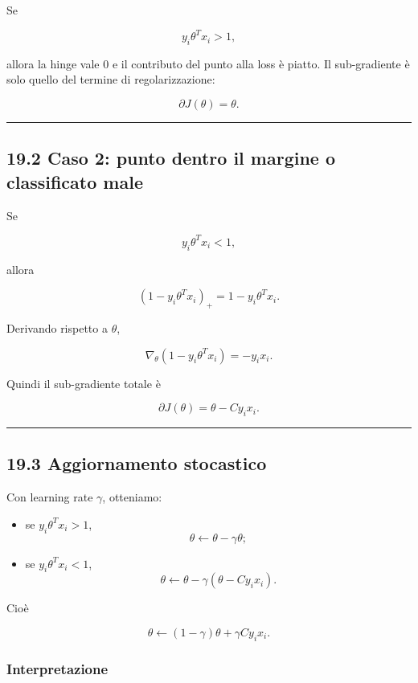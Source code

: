 \documentclass[
]{article}
\begin{document}
Se

\[
y_i\theta^Tx_i > 1,
\]

allora la hinge vale \(0\) e il contributo del punto alla loss è piatto.
Il sub-gradiente è solo quello del termine di regolarizzazione:

\[
\partial J(\theta)=\theta.
\]

\begin{center}\rule{0.5\linewidth}{0.5pt}\end{center}

\subsection{19.2 Caso 2: punto dentro il margine o classificato
male}\label{caso-2-punto-dentro-il-margine-o-classificato-male}

Se

\[
y_i\theta^Tx_i < 1,
\]

allora

\[
(1-y_i\theta^Tx_i)_+ = 1-y_i\theta^Tx_i.
\]

Derivando rispetto a \(\theta\),

\[
\nabla_\theta(1-y_i\theta^Tx_i) = -y_i x_i.
\]

Quindi il sub-gradiente totale è

\[
\partial J(\theta)=\theta - C y_i x_i.
\]

\begin{center}\rule{0.5\linewidth}{0.5pt}\end{center}

\subsection{19.3 Aggiornamento
stocastico}\label{aggiornamento-stocastico}

Con learning rate \(\gamma\), otteniamo:

\begin{itemize}
\item
  se \(y_i\theta^Tx_i>1\), \[
  \theta \leftarrow \theta - \gamma \theta;
  \]
\item
  se \(y_i\theta^Tx_i<1\), \[
  \theta \leftarrow \theta - \gamma(\theta - C y_i x_i).
  \]
\end{itemize}

Cioè

\[
\theta \leftarrow (1-\gamma)\theta + \gamma C y_i x_i.
\]

\subsubsection{Interpretazione}\label{interpretazione-6}
\end{document}
